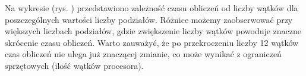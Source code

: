 Na wykresie (rys. ) przedstawiono zależność czasu obliczeń od liczby wątków dla poszczególnych wartości liczby podziałów.
Różnice możemy zaobserwować przy większych liczbach podziałów, gdzie zwiększenie liczby wątków powoduje znaczne skrócenie czasu obliczeń.
Warto zauważyć, że po przekroczeniu liczby 12 wątków czas obliczeń nie ulega już znaczącej zmianie, co może wynikać z ograniczeń sprzętowych (ilość wątków procesora).
